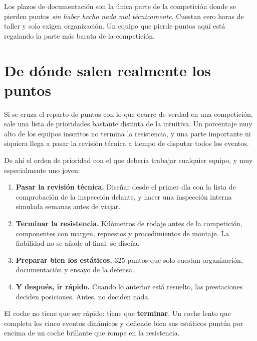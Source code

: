 
\begin{clave}
Los plazos de documentación son la única parte de la competición donde se pierden
puntos \emph{sin haber hecho nada mal técnicamente}. Cuestan cero horas de taller
y solo exigen organización. Un equipo que pierde puntos aquí está regalando la
parte más barata de la competición.
\end{clave}

\section{De dónde salen realmente los puntos}
\label{sec:formula_student:05}

Si se cruza el reparto de puntos con lo que ocurre de verdad en una competición,
sale una lista de prioridades bastante distinta de la intuitiva. Un porcentaje
muy alto de los equipos inscritos no termina la resistencia, y una parte
importante ni siquiera llega a pasar la revisión técnica a tiempo de disputar
todos los eventos.

De ahí el orden de prioridad con el que debería trabajar cualquier equipo, y muy
especialmente uno joven:

\begin{enumerate}
  \item \textbf{Pasar la revisión técnica.} Diseñar desde el primer día con la
        lista de comprobación de la inspección delante, y hacer una inspección
        interna simulada semanas antes de viajar.
  \item \textbf{Terminar la resistencia.} Kilómetros de rodaje antes de la
        competición, componentes con margen, repuestos y procedimientos de
        montaje. La fiabilidad no se añade al final: se diseña.
  \item \textbf{Preparar bien los estáticos.} 325 puntos que solo cuestan
        organización, documentación y ensayo de la defensa.
  \item \textbf{Y después, ir rápido.} Cuando lo anterior está resuelto, las
        prestaciones deciden posiciones. Antes, no deciden nada.
\end{enumerate}

\begin{clave}
El coche no tiene que ser rápido: tiene que \textbf{terminar}. Un coche lento que
completa los cinco eventos dinámicos y defiende bien sus estáticos puntúa por
encima de un coche brillante que rompe en la resistencia.
\end{clave}


